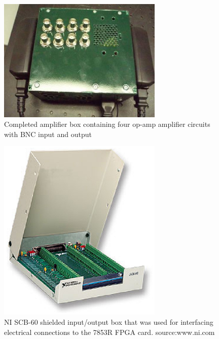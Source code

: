 \begin{figure}[ht!]
\centering
\includegraphics[width=0.7\textwidth]{eps_pics/ampBox}
\caption{Completed amplifier box containing four op-amp amplifier circuits with BNC input and output
	 \label{fig:ampBox}} 
\end{figure}

\begin{figure}[ht!]
\centering
\includegraphics[width=0.7\textwidth]{eps_pics/ioBox}
\caption{NI SCB-60 shielded input/output box that was used for interfacing electrical connections to the 7853R FPGA card. \newline source:www.ni.com
	 \label{fig:ioBox}} 
\end{figure}

